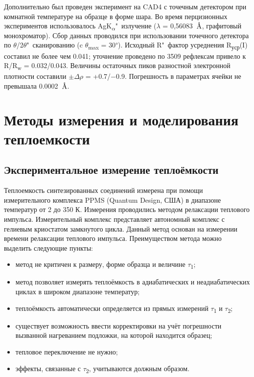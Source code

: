 Дополнительно был проведен эксперимент на CAD4 с точечным детектором при комнатной температуре на образце в форме шара. Во время перцизионных  экспериментов использовалось AgK\textsubscript{$\alpha$}"~излучение ($\lambda$ = 0,56083~${\mbox{\normalfont\AA}}$, графитовый монохроматор). Сбор данных проводился при использовании точечного детектора по $\theta$/2$\theta$"~сканированию (c $\theta$\textsubscript{max} = 30\textsuperscript{$\circ$}). 
Исходный R"~фактор усреднения R\textsubscript{уср}(I) составил не более чем  0.041; уточнение проведено по 3509 рефлексам привело к R/R\textsubscript{w} = 0.032/0.043. 
Величины остаточных пиков разностной электронной плотности составили $\pm\Delta$$\rho$ = +0.7/$-$0.9. 
Погрешность в параметрах ячейки не превышала 0.0002~{$\mbox{\normalfont\AA}$}. 

\newpage
\section{Методы измерения и моделирования теплоемкости} \label{sect2_4}
\subsection{Экспериментальное измерение теплоёмкости}\label{sect2_4_1}
Теплоемкость синтезированных соединений измерена при помощи измерительного комплекса PPMS (Quantum Design,
США) в диапазоне температур от 2 до 350 К. Измерения проводились методом релаксации теплового
импульса\cite{Hwang_1997}. Измерительный комплекс представляет автономный комплекс с гелиевым криостатом замкнутого цикла. Данный метод основан на измерении времени релаксации теплового импульса. Преимуществом метода можно выделить следующие пункты:
\begin{itemize}
\item метод не критичен к размеру, форме образца и величине $\tau$\textsubscript{1};

\item метод позволяет измерять теплоёмкость в адиабатических и неадиабатических циклах в широком диапазоне температур;

\item теплоёмкость автоматически определяется из прямых измерений  $\tau$\textsubscript{1} и $\tau$\textsubscript{2};

\item существует возможность ввести корректировки на учёт погрешности вызванной нагреванием подложки, на которой находится образец;

\item тепловое переключение не нужно;

\item эффекты, связанные с $\tau$\textsubscript{2}, учитываются должным образом.
\end{itemize}


